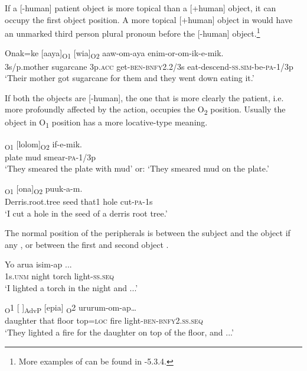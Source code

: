 If a [-human] patient object is more topical than a [+human] object, it can occupy the first object position. A more topical [+human] object in  would have an unmarked third person plural pronoun before the [-human] object.\footnote{More examples of can be found in -5.3.4.}

\ea%
\label{ex:5:x917}
\gll Onak=ke  [aaya]\textsubscript{O1}  [wia]\textsubscript{O2}  aaw-om-aya enim-or-om-ik-e-mik. \\
      3s/p.mother  sugarcane  3p.\textsc{acc}  get-\textsc{ben}-\textsc{bnfy}2.2/3s eat-descend-\textsc{ss}.\textsc{sim}-be-\textsc{pa}-1/3p \\
\glt `Their mother got sugarcane for them and they went down eating it.'
\z

If both the objects are [-human], the one that is more clearly the patient, i.e. more profoundly affected by the action, occupies the O\textsubscript{2} position. Usually the object in O\textsubscript{1} position has a more locative-type meaning.

\ea%
\label{ex:5:x927}
\gll [Epira]\textsubscript{O1}  [lolom]\textsubscript{O2}  if-e-mik. \\
      plate  mud  smear-\textsc{pa}-1/3p \\
\glt `They smeared the plate with mud' or: `They smeared mud on the plate.'
\z

\ea%
\label{ex:5:x934}
\textsubscript{O1}  [ona]\textsubscript{O2}  puuk-a-m. \\
     Derris.root.tree  seed  that1  hole  cut-\textsc{pa}-1s \\
\glt `I cut a hole in the seed of a derris root tree.'
\z

The normal position of the peripherals is between the subject and the object  if any , or between the first and second object . 

\ea%
\label{ex:5:x895}
\gll Yo    arua  isim-ap  ... \\
     1s.\textsc{unm}  night  torch  light-\textsc{ss}.\textsc{seq} \\
\glt `I lighted a torch in the night and ...'
\z

\ea%
\label{ex:5:x913}
\textsubscript{O}1  [ ]\textsubscript{AdvP}  [epia] \textsubscript{O}2 ururum-om-ap{\dots} \\
     daughter  that  floor  top=\textsc{loc}  fire light-\textsc{ben}-\textsc{bnfy}2.\textsc{ss}.\textsc{seq} \\
\glt `They lighted a fire for the daughter on top of the floor, and ...'
\z

